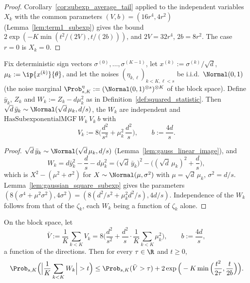\begin{proof}
\leanok
{}
Corollary~\ref{cor:subexp_average_tail} applied to the independent variables $X_k$ with the
common parameters $(V, b) = (16r^4, 4r^2)$ (Lemma~\ref{lem:term1_subexp}) gives the bound
$2\exp(-K\min(t^2/(2V), t/(2b)))$, and $2V = 32r^4$, $2b = 8r^2$. The case $r = 0$ is
$X_k = 0$.
\end{proof}

\begin{lemma}\label{lem:term2_conditional}
\leanok
{}
Fix deterministic sign vectors $\sigma^{(0)}, \dots, \sigma^{(K-1)}$, let
$x^{(k)} := \sigma^{(k)}/\sqrt d$, $\mu_k := \ip{x^{(k)}}{\theta}$, and let the noises
$(\eta_{k,\ell})_{k<K,\ell<s}$ be i.i.d.\ $\Normal(0,1)$ (the noise marginal
$\Prob^{\eta}_{s,K} := (\Normal(0,1)^{\otimes s})^{\otimes K}$ of the block space). Define
$\bar y_k$, $Z_k$ and $W_k := Z_k - d\mu_k^2$ as in Definition~\ref{def:squared_statistic}.
Then $\sqrt d\,\bar y_k \sim \Normal(\sqrt d\,\mu_k, d/s)$, the $W_k$ are independent and
$\mathrm{HasSubexponentialMGF}\ W_k\ V_k\ b$ with
\[
  V_k := 8\Big( \frac{d^2}{s^2} + \mu_k^2\,\frac{d^2}{s} \Big), \qquad b := \frac{4d}{s} .
\]
\end{lemma}

\begin{proof}
\leanok
{}
$\sqrt d\,\bar y_k \sim \Normal(\sqrt d\,\mu_k, d/s)$ (Lemma~\ref{lem:gauss_linear_image}),
and
\[
  W_k = d\bar y_k^2 - \frac ds - d\mu_k^2
      = \big(\sqrt d\,\bar y_k\big)^2 - \Big( (\sqrt d\,\mu_k)^2 + \frac ds \Big),
\]
which is $X^2 - (\mu^2 + \sigma^2)$ for $X \sim \Normal(\mu,\sigma^2)$ with
$\mu = \sqrt d\,\mu_k$, $\sigma^2 = d/s$. Lemma~\ref{lem:gaussian_square_subexp} gives the
parameters $(8(\sigma^4 + \mu^2\sigma^2), 4\sigma^2) = (8(d^2/s^2 + \mu_k^2 d^2/s), 4d/s)$.
Independence of the $W_k$ follows from that of the $\zeta_k$, each $W_k$ being a function
of $\zeta_k$ alone.
\end{proof}

\begin{lemma}\label{lem:term2_bound}
\leanok
{}
On the block space, let
\[
  \bar V := \frac1K\sum_{k<K} V_k
  = 8\Big( \frac{d^2}{s^2} + \frac{d^2}{s}\cdot\frac1K\sum_{k<K}\mu_k^2 \Big),
  \qquad b := \frac{4d}{s} ,
\]
a function of the directions. Then for every $\tau \in \R$ and $t \ge 0$,
\[
  \Prob_{s,K}\Big( \Big| \frac1K\sum_{k<K} W_k \Big| > t \Big)
  \le \Prob_{s,K}(\bar V > \tau)
    + 2\exp\Big( -K\min\Big( \frac{t^2}{2\tau}, \frac{t}{2b} \Big) \Big).
\]
\end{lemma}

